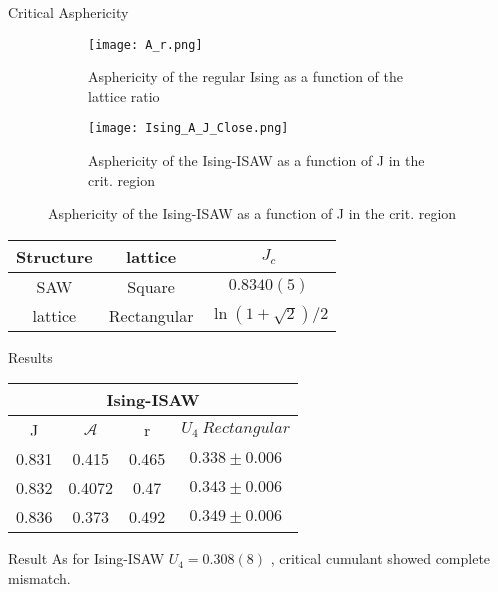 \documentclass{beamer}
\begin{document}
\begin{frame}{Critical Asphericity}

\begin{figure}
\centering
\begin{subfigure}{0.45\textwidth}
\texttt{[image: A\_r.png]}
\caption{Asphericity of the regular Ising as a function of the lattice ratio}
\end{subfigure}
\hfill
\begin{subfigure}{0.45\textwidth}
\texttt{[image: Ising\_A\_J\_Close.png]}
\caption{Asphericity of the Ising-ISAW as a function of J in the crit. region}
\end{subfigure}
\end{figure}


\begin{table}
\begin{tabular}{|c|c|c|}
    \hline
        Structure & lattice & $J_{c}$ \\ \hline
        SAW & Square & $0.8340(5)$\cite{faizullina2021critical} \\ \hline
        lattice & Rectangular & $\ln{(1 + \sqrt{2}) / 2}$\cite{Onsager}\\ \hline
\end{tabular}
\end{table}
\end{frame}

\begin{frame}{Results}

\begin{table}
\begin{tabular}{|c|c|c|c|}
        \hline
         \multicolumn{4}{|c|}{Ising-ISAW}  \\ \hline
         J & $\mathcal{A}$ & r & $U_{4}\  Rectangular$ \\ \hline
         0.831 & 0.415 & 0.465 & $0.338 \pm 0.006$\\ \hline
         0.832 & 0.4072 & 0.47 & $0.343 \pm 0.006$\\ \hline
         0.836 & 0.373 & 0.492 & $0.349 \pm 0.006$\\ \hline
\end{tabular}
\end{table}

\begin{block}{Result}
As for Ising-ISAW $U_4 = 0.308(8)$ \cite{faizullina2021critical}, critical cumulant showed \alert{complete mismatch}.
\end{block}

\end{frame}
\end{document}
